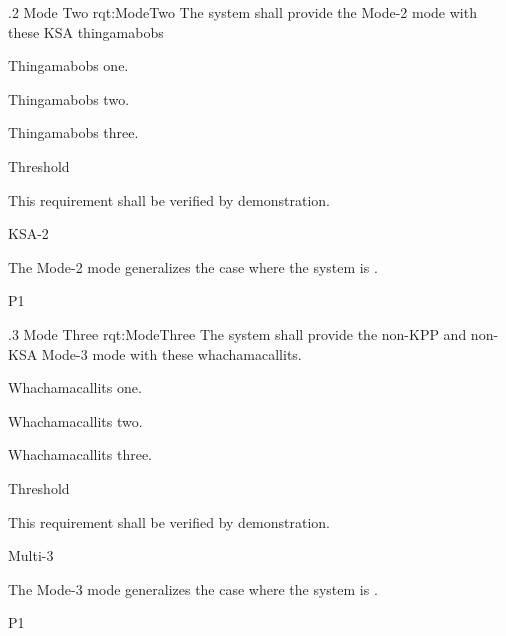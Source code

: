 \MULTIRQMTVKSA
{\RqtNumberBase.2}
{Mode Two}
{rqt:ModeTwo}
{The system shall provide the Mode-2 mode with these KSA thingamabobs}
{
	\item Thingamabobs one.
	\item Thingamabobs two.
	\item Thingamabobs three.
}
{
	\item [Phase 1] Threshold
}
{This requirement shall be verified by demonstration.}
{
	\item [\cite{ref__KNEAD_Manual}] KSA-2
}
{
	\item The Mode-2 mode generalizes the case where the system is \TBD.
}
{P1}


\MULTIRQMTV
{\RqtNumberBase.3}
{Mode Three}
{rqt:ModeThree}
{The system shall provide the non-KPP and non-KSA Mode-3 mode with these whachamacallits.}
{
	\item Whachamacallits one.
	\item Whachamacallits two.
	\item Whachamacallits three.
}
{
	\item [Phase 1] Threshold
}
{This requirement shall be verified by demonstration.}
{
	\item [\cite{ref__KNEAD_Manual}] Multi-3
}
{
	\item The Mode-3 mode generalizes the case where the system is \TBD.
}
{P1}
